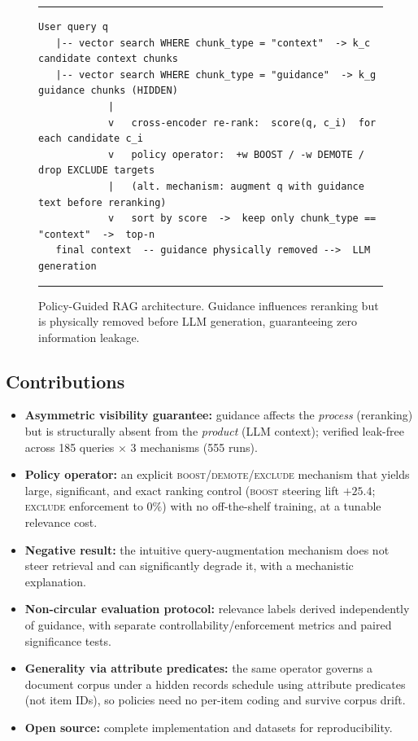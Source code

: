 \documentclass[11pt]{article}
\begin{document}
\begin{figure}[t]
\centering
\noindent\rule{\linewidth}{0.4pt}
{\footnotesize
\begin{verbatim}
User query q
   |-- vector search WHERE chunk_type = "context"  -> k_c candidate context chunks
   |-- vector search WHERE chunk_type = "guidance"  -> k_g guidance chunks (HIDDEN)
            |
            v   cross-encoder re-rank:  score(q, c_i)  for each candidate c_i
            v   policy operator:  +w BOOST / -w DEMOTE / drop EXCLUDE targets
            |   (alt. mechanism: augment q with guidance text before reranking)
            v   sort by score  ->  keep only chunk_type == "context"  ->  top-n
   final context  -- guidance physically removed -->  LLM generation
\end{verbatim}
}
\noindent\rule{\linewidth}{0.4pt}
\caption{Policy-Guided RAG architecture. Guidance influences reranking but is physically
removed before LLM generation, guaranteeing zero information leakage.}
\label{fig:arch}
\end{figure}

\subsection{Contributions}
\begin{itemize}[leftmargin=1.4em,itemsep=2pt]
  \item \textbf{Asymmetric visibility guarantee:} guidance affects the \emph{process}
  (reranking) but is structurally absent from the \emph{product} (LLM context); verified
  leak-free across 185 queries $\times$ 3 mechanisms (555 runs).
  \item \textbf{Policy operator:} an explicit \textsc{boost}/\textsc{demote}/\textsc{exclude}
  mechanism that yields large, significant, and exact ranking control
  (\textsc{boost} steering lift $+25.4$; \textsc{exclude} enforcement to $0\%$) with no
  off-the-shelf training, at a tunable relevance cost.
  \item \textbf{Negative result:} the intuitive query-augmentation mechanism does not steer
  retrieval and can significantly degrade it, with a mechanistic explanation.
  \item \textbf{Non-circular evaluation protocol:} relevance labels derived independently of
  guidance, with separate controllability/enforcement metrics and paired significance tests.
  \item \textbf{Generality via attribute predicates:} the same operator governs a document
  corpus under a hidden records schedule using attribute predicates (not item IDs), so policies
  need no per-item coding and survive corpus drift.
  \item \textbf{Open source:} complete implementation and datasets for reproducibility.
\end{itemize}
\end{document}
